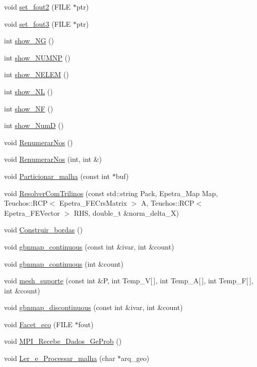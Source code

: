 \begin{DoxyCompactItemize}
\item 
void \hyperlink{classGeProb_a18762ac0ce4ba659b15e97a5521bc456}{set\+\_\+fout2} (F\+I\+LE $\ast$ptr)
\item 
void \hyperlink{classGeProb_a2fa255c26250f6ee540b910949f530ed}{set\+\_\+fout3} (F\+I\+LE $\ast$ptr)
\item 
int \hyperlink{classGeProb_a2f37b74c21a3bdc3fc112babc8a0123b}{show\+\_\+\+NG} ()
\item 
int \hyperlink{classGeProb_a9470702789ccb98b8c952d3259bcba7f}{show\+\_\+\+N\+U\+M\+NP} ()
\item 
int \hyperlink{classGeProb_aa9c2c6d251e061c3cf58806097c55f04}{show\+\_\+\+N\+E\+L\+EM} ()
\item 
int \hyperlink{classGeProb_a6a4db729e1c6eab1165fb861b16649ac}{show\+\_\+\+NL} ()
\item 
int \hyperlink{classGeProb_ac7f36c8a5ae46b8ddc8cdd8db059e9cc}{show\+\_\+\+NF} ()
\item 
int \hyperlink{classGeProb_a95d6202865332fd522738383003d7b25}{show\+\_\+\+NumD} ()
\item 
void \hyperlink{classGeProb_a18cfc81b7accb83b55b9e69d2738c5de}{Renumerar\+Nos} ()
\item 
void \hyperlink{classGeProb_aa656597aedeff1096736c98b1f51c55f}{Renumerar\+Nos} (int, int \&)
\item 
void \hyperlink{classGeProb_ac439ec4e4198924d385d8948edb20708}{Particionar\+\_\+malha} (const int $\ast$buf)
\item 
void \hyperlink{classGeProb_a479ff26c0f91f09a7b92cabf9894c64e}{Resolver\+Com\+Trilinos} (const std\+::string Pack, Epetra\+\_\+\+Map Map, Teuchos\+::\+R\+CP$<$ Epetra\+\_\+\+F\+E\+Crs\+Matrix $>$ A, Teuchos\+::\+R\+CP$<$ Epetra\+\_\+\+F\+E\+Vector $>$ R\+HS, double\+\_\+t \&norm\+\_\+delta\+\_\+X)
\item 
void \hyperlink{classGeProb_ab622a6354ec337bab6c2563049b0db4f}{Construir\+\_\+bordas} ()
\item 
void \hyperlink{classGeProb_aa2d34febad6985ceacd95ba6e10536f8}{gbnmap\+\_\+continuous} (const int \&ivar, int \&count)
\item 
void \hyperlink{classGeProb_a4a405a3f566e10cf77906d21606c97bd}{gbnmap\+\_\+continuous} (int \&count)
\item 
void \hyperlink{classGeProb_ab33e0027b5ae2b712b91690b8cb75e90}{mesh\+\_\+suporte} (const int \&P, int Temp\+\_\+V\mbox{[}$\,$\mbox{]}, int Temp\+\_\+A\mbox{[}$\,$\mbox{]}, int Temp\+\_\+F\mbox{[}$\,$\mbox{]}, int \&count)
\item 
void \hyperlink{classGeProb_a4ceec7b2e7cad8ba29dd8d751840a22b}{gbnmap\+\_\+discontinuous} (const int \&ivar, int \&count)
\item 
void \hyperlink{classGeProb_ae30b85570c7c33bb4429f9ed91532807}{Facet\+\_\+eco} (F\+I\+LE $\ast$fout)
\item 
void \hyperlink{classGeProb_a79ef11abf1d43923fb5a3613a3fa654e}{M\+P\+I\+\_\+\+Recebe\+\_\+\+Dados\+\_\+\+Ge\+Prob} ()
\item 
void \hyperlink{classGeProb_ac1030cadfbc0d88e817617a927dbc31f}{Ler\+\_\+e\+\_\+\+Processar\+\_\+malha} (char $\ast$arq\+\_\+geo)
\end{DoxyCompactItemize}
